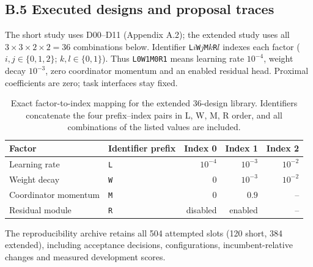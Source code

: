 \subsection*{B.5 Executed designs and proposal traces}
The short study uses D00--D11 (Appendix A.2); the extended study uses all $3\times3\times2\times2=36$ combinations below. Identifier \texttt{L}$i$\texttt{W}$j$\texttt{M}$k$\texttt{R}$l$ indexes each factor ($i,j\in\{0,1,2\}$; $k,l\in\{0,1\}$). Thus \texttt{L0W1M0R1} means learning rate $10^{-4}$, weight decay $10^{-3}$, zero coordinator momentum and an enabled residual head. Proximal coefficients are zero; task interfaces stay fixed.

\begin{table}[htbp]
\caption{Exact factor-to-index mapping for the extended 36-design library. Identifiers concatenate the four prefix--index pairs in L, W, M, R order, and all combinations of the listed values are included.}
\label{tab:completed-menu-long24}
\centering\small
\begin{tabular}{llrrr}
\toprule
Factor & Identifier prefix & Index 0 & Index 1 & Index 2 \\
\midrule
Learning rate & \texttt{L} & $10^{-4}$ & $10^{-3}$ & $10^{-2}$ \\
Weight decay & \texttt{W} & $0$ & $10^{-3}$ & $10^{-2}$ \\
Coordinator momentum & \texttt{M} & $0$ & $0.9$ & -- \\
Residual module & \texttt{R} & disabled & enabled & -- \\
\bottomrule
\end{tabular}
\end{table}

The reproducibility archive retains all 504 attempted slots (120 short, 384 extended), including acceptance decisions, configurations, incumbent-relative changes and measured development scores.


